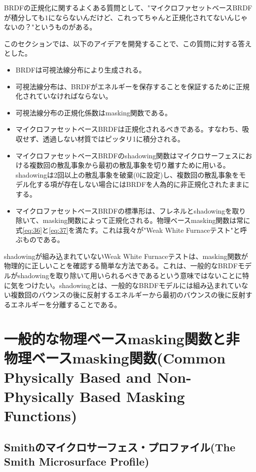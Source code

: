 \documentclass[a4j,xelatex,ja=standard]{bxjsarticle}
\begin{document}
BRDFの正規化に関するよくある質問として、"マイクロファセットベースBRDFが積分しても$1$にならないんだけど、これってちゃんと正規化されてないんじゃないの？"というものがある。

このセクションでは、以下のアイデアを開発することで、この質問に対する答えとした。

\begin{itemize}
\item BRDFは可視法線分布により生成される。
\item 可視法線分布は、BRDFがエネルギーを保存することを保証するために正規化されていなければならない。
\item 可視法線分布の正規化係数はmasking関数である。
\item マイクロファセットベースBRDFは正規化されるべきである。すなわち、吸収せず、透過しない材質ではピッタリ1に積分される。
\item マイクロファセットベースBRDFのshadowing関数はマイクロサーフェスにおける複数回の散乱事象から最初の散乱事象を切り離すために用いる。shadowingは2回以上の散乱事象を破棄(0に設定)し、複数回の散乱事象をモデル化する項が存在しない場合にはBRDFを人為的に非正規化されたままにする。
\item マイクロファセットベースBRDFの標準形は、フレネルとshadowingを取り除いて、masking関数によって正規化される。物理ベースmasking関数は常に式\eqref{eq:36}と\eqref{eq:37}を満たす。これは我々が"Weak White Furnaceテスト"と呼ぶものである。
\end{itemize}

shadowingが組み込まれていないWeak White Furnaceテストは、masking関数が物理的に正しいことを確認する簡単な方法である。これは、一般的なBRDFモデルがshadowingを取り除いて用いられるべきであるという意味ではないことに特に気をつけたい。shadowingとは、一般的なBRDFモデルには組み込まれていない複数回のバウンスの後に反射するエネルギーから最初のバウンスの後に反射するエネルギーを分離することである。

\section{一般的な物理ベースmasking関数と非物理ベースmasking関数(Common Physically Based and Non-Physically Based Masking Functions)}

\subsection{Smithのマイクロサーフェス・プロファイル(The Smith Microsurface Profile)}
\label{sec:4.1}
\end{document}
